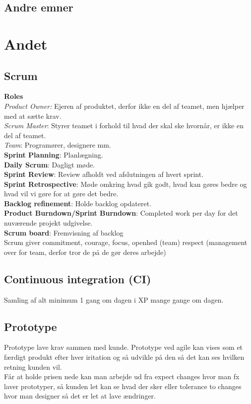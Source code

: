 \documentclass[11pt,a4paper]{article}
\begin{document}
\subsection{Andre emner}
\newpage
\section{Andet}
\subsection{Scrum}
\textbf{Roles}\\
\textit{Product Owner:} Ejeren af produktet, derfor ikke en del af teamet, men hjælper med at sætte krav.\\
\textit{Scrum Master}: Styrer teamet i forhold til hvad der skal ske hvornår,
er ikke en del af teamet.\\
\textit{Team}: Programører, designere mm.\\
\textbf{Sprint Planning}: Planlægning.\\
\textbf{Daily Scrum}: Dagligt møde.\\
\textbf{Sprint Review}: Review afholdt ved afslutningen af hvert sprint.\\
\textbf{Sprint Retrospective}: Møde omkring hvad gik godt, hvad kan gøres
bedre og hvad vil vi gøre for at gøre det bedre.\\
\textbf{Backlog refinement}: Holde backlog opdateret.\\
\textbf{Product Burndown/Sprint Burndown}: Completed work per day for det nuværende projekt udgivelse.\\
\textbf{Scrum board}: Fremvisning af backlog\\
Scrum giver commitment, courage, focus, openhed (team) respect
(management over for team, derfor tror de på de gør deres arbejde)
\subsection{Continuous integration (CI)}
Samling af alt minimum 1 gang om dagen i XP mange gange om dagen.
\subsection{Prototype}
Prototype lave krav sammen med kunde. Prototype ved agile kan vises som et færdigt produkt efter hver iritation og så udvikle på den så det kan ses hvilken retning kunden vil.\\
Får at holde prisen nede kan man arbejde ud fra expect changes hvor man fx laver prototyper, så kunden let kan se hvad der sker eller tolerance to changes hvor man designer så det er let at lave ændringer.
\end{document}
